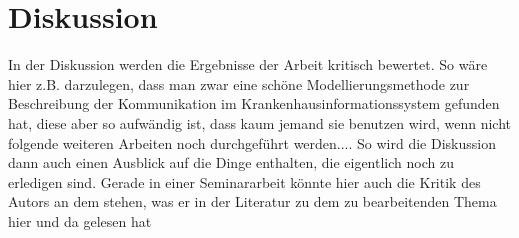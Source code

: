 \chapter{Diskussion}\label{ch:discussion}
\begin{temp}
In der Diskussion werden die Ergebnisse der Arbeit kritisch bewertet.
So wäre hier z.B. darzulegen, dass man zwar eine schöne Modellierungsmethode zur Beschreibung der Kommunikation im Krankenhausinformationssystem gefunden hat, diese aber so aufwändig ist, dass kaum jemand sie benutzen wird, wenn nicht folgende weiteren Arbeiten noch durchgeführt werden....
So wird die Diskussion dann auch einen Ausblick auf die Dinge enthalten, die eigentlich noch zu erledigen sind.
Gerade in einer Seminararbeit könnte hier auch die Kritik des Autors an dem stehen, was er in der Literatur zu dem zu bearbeitenden Thema hier und da gelesen hat
\end{temp}
